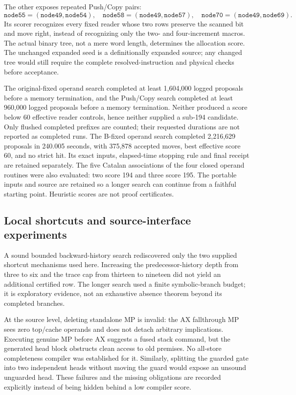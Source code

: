 \documentclass[11pt]{article}
\begin{document}
The other exposes repeated Push/Copy pairs:
\[
 \texttt{node55}=(\texttt{node49},\texttt{node54}),\quad
 \texttt{node58}=(\texttt{node49},\texttt{node57}),\quad
 \texttt{node70}=(\texttt{node49},\texttt{node69}).
\]
Its scorer recognizes every fixed reader whose two rows preserve the scanned bit and move right, instead of recognizing only the two- and four-increment macros. The actual binary tree, not a mere word length, determines the allocation score. The unchanged expanded seed is a definitionally expanded source; any changed tree would still require the complete resolved-instruction and physical checks before acceptance.

The original-fixed operand search completed at least 1,604,000 logged proposals before a memory termination, and the Push/Copy search completed at least 960,000 logged proposals before a memory termination. Neither produced a score below 60 effective reader controls, hence neither supplied a sub-194 candidate. Only flushed completed prefixes are counted; their requested durations are not reported as completed runs. The B-fixed operand search completed 2,216,629 proposals in 240.005 seconds, with 375,878 accepted moves, best effective score 60, and no strict hit. Its exact inputs, elapsed-time stopping rule and final receipt are retained separately. The five Catalan associations of the four closed operand routines were also evaluated: two score 194 and three score 195. The portable inputs and source are retained so a longer search can continue from a faithful starting point. Heuristic scores are not proof certificates.

\subsection{Local shortcuts and source-interface experiments}
A sound bounded backward-history search rediscovered only the two supplied shortcut mechanisms used here. Increasing the predecessor-history depth from three to six and the trace cap from thirteen to nineteen did not yield an additional certified row. The longer search used a finite symbolic-branch budget; it is exploratory evidence, not an exhaustive absence theorem beyond its completed branches.

At the source level, deleting standalone MP is invalid: the AX fallthrough MP sees zero top/cache operands and does not detach arbitrary implications. Executing genuine MP before AX suggests a fused stack command, but the generated head block obstructs clean access to old premises. No all-store completeness compiler was established for it. Similarly, splitting the guarded gate into two independent heads without moving the guard would expose an unsound unguarded head. These failures and the missing obligations are recorded explicitly instead of being hidden behind a low compiler score.
\end{document}
